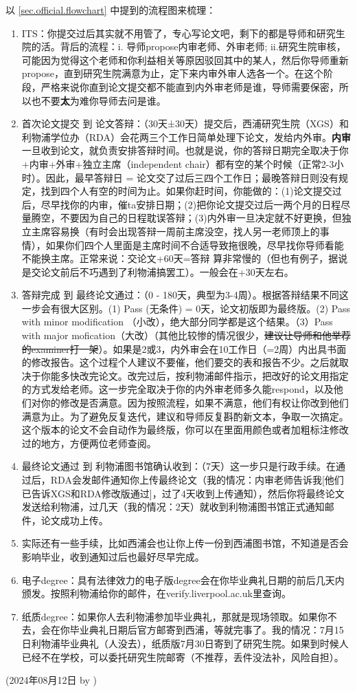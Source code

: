 以 \ref{sec.official.flowchart} 中提到的流程图来梳理：
\begin{enumerate}
    \item ITS：你提交过后其实就不用管了，专心写论文吧，剩下的都是导师和研究生院的活。背后的流程：i. 导师propose内审老师、外审老师; ii.研究生院审核，可能因为觉得这个老师和你利益相关等原因驳回其中的某人，然后你导师重新propose，直到研究生院满意为止，定下来内审外审人选各一个。在这个阶段，严格来说你直到论文提交都不能直到内外审老师是谁，导师需要保密，所以也不要\textbf{太}为难你导师去问是谁。
    \item 首次论文提交 到 论文答辩：（30天±30天）提交后，西浦研究生院（XGS）和利物浦学位办（RDA）会花两三个工作日简单处理下论文，发给内外审。\textbf{内审}一旦收到论文，就负责安排答辩时间。也就是说，你的答辩日期完全取决于你+内审+外审+独立主席（independent chair）都有空的某个时候（正常2-3小时）。因此，最早答辩日 = 论文交了过后三四个工作日；最晚答辩日则没有规定，找到四个人有空的时间为止。如果你赶时间，你能做的：(1)论文提交过后，尽早找你的内审，催ta安排日期；(2)把你论文提交过后一两个月的日程尽量腾空，不要因为自己的日程耽误答辩；(3)内外审一旦决定就不好更换，但独立主席容易换（有时会出现答辩一周前主席没空，找人另一老师顶上的事情），如果你们四个人里面是主席时间不合适导致拖很晚，尽早找你导师看能不能换主席。正常来说：交论文+60天=答辩 算非常慢的（但也有例子，据说是交论文前后不巧遇到了利物浦搞罢工）。一般会在+30天左右。
    \item 答辩完成 到 最终论文通过：（0 - 180天，典型为3-4周）。根据答辩结果不同这一步会有很大区别。(1) Pass (无条件) = 0天，论文初版即为最终版。(2) Pass with minor modification （小改），绝大部分同学都是这个结果。（3）Pass with major mofication（大改）（其他比较惨的情况很少，\sout{建议让导师和他举荐的examiner打一架}）。如果是2或3，内外审会在10工作日（=2周）内出具书面的修改报告。这个过程个人建议不要催，他们要交的表和报告不少。之后就取决于你能多快改完论文。改完过后，按利物浦邮件指示，把改好的论文用指定的方式发给老师。这一步完全取决于你的内外审老师多久能respond，以及他们对你的修改是否满意。因为按照流程，如果不满意，他们有权让你改到他们满意为止。为了避免反复迭代，建议和导师反复斟酌新文本，争取一次搞定。这个版本的论文不会自动作为最终版，你可以在里面用颜色或者加粗标注修改过的地方，方便两位老师查阅。
    \item 最终论文通过 到 利物浦图书馆确认收到：（7天）这一步只是行政手续。在通过后，RDA会发邮件通知你上传最终论文（我的情况：内审老师告诉我[他们已告诉XGS和RDA修改版通过]，过了4天收到上传通知），然后你将最终论文发送给利物浦，过几天（我的情况：2天）就收到利物浦图书馆正式通知邮件，论文成功上传。
    \item 实际还有一些手续，比如西浦会也让你上传一份到西浦图书馆，不知道是否会影响毕业，收到通知过后也最好尽早完成。
    \item 电子degree：具有法律效力的电子版degree会在你毕业典礼日期的前后几天内颁发。按照利物浦给你的邮件，在verify.liverpool.ac.uk里查询。
    \item 纸质degree：如果你人去利物浦参加毕业典礼，那就是现场领取。如果你不去，会在你毕业典礼日期后官方邮寄到西浦，等就完事了。我的情况：7月15日利物浦毕业典礼（人没去），纸质版7月30日寄到了研究生院。如果到时候人已经不在学校，可以委托研究生院邮寄（不推荐，丢件没法补，风险自担）。
\end{enumerate}

\begin{flushright}
    (2024年08月12日 by \Wu)
\end{flushright}